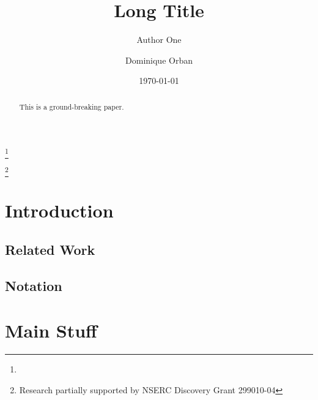 \documentclass{amsart}
\begin{document}
\linenumbers

\title[Short Title]{%
  Long Title
}

\author[A. One]{Author One}
\address{%
  Some Lab, Some Univeristy, Some Place
}
\thanks{}

\author[D. Orban]{Dominique Orban}
\address{%
  GERAD and
  Mathematics and Industrial Engineering Department \\
  \'Ecole Polytechnique, Montr\'eal, Canada
}
\thanks{Research partially supported by NSERC Discovery Grant 299010-04}



\date{\today}

\begin{abstract}
  This is a ground-breaking paper.
\end{abstract}

\maketitle

\pagestyle{myheadings}

\tableofcontents
\listoftodos\relax   %

\section{Introduction}

\subsection{Related Work}

\subsection{Notation}


\section{Main Stuff}
\end{document}
